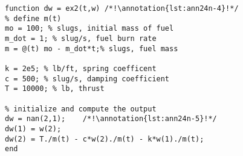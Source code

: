 \begin{lstlisting}[style=myMatlab,name=lec24n-ex2]
function dw = ex2(t,w) /*!\annotation{lst:ann24n-4}!*/
% define m(t)
mo = 100; % slugs, initial mass of fuel
m_dot = 1; % slug/s, fuel burn rate
m = @(t) mo - m_dot*t;% slugs, fuel mass

k = 2e5; % lb/ft, spring coefficent
c = 500; % slug/s, damping coefficient
T = 10000; % lb, thrust

% initialize and compute the output
dw = nan(2,1);    /*!\annotation{lst:ann24n-5}!*/
dw(1) = w(2);
dw(2) = T./m(t) - c*w(2)./m(t) - k*w(1)./m(t);
end
\end{lstlisting}

